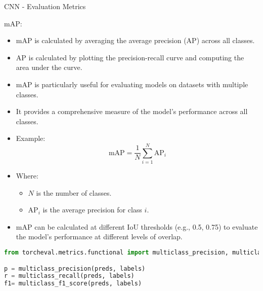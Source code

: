 \begin{frame}{CNN - Evaluation Metrics}
\begin{block}{mAP:}
    \begin{itemize}
        \item mAP is calculated by averaging the average precision (AP) across all classes.
        \item AP is calculated by plotting the precision-recall curve and computing the area under the curve.
        \item mAP is particularly useful for evaluating models on datasets with multiple classes.
        \item It provides a comprehensive measure of the model's performance across all classes.
        \item Example:
            \[
            \text{mAP} = \frac{1}{N} \sum_{i=1}^{N} \text{AP}_i
            \]
            \item Where:
                \begin{itemize}
                    \item \(N\) is the number of classes.
                    \item \(\text{AP}_i\) is the average precision for class \(i\).
                \end{itemize}
        \item mAP can be calculated at different IoU thresholds (e.g., 0.5, 0.75) to evaluate the model's performance at different levels of overlap.
    \end{itemize}
\end{block}
\framebreak

\begin{lstlisting}[language=Python, caption={Code snippet (PyTorch)}, basicstyle=\ttfamily\footnotesize]
from torcheval.metrics.functional import multiclass_precision, multiclass_recall, multiclass_f1_score

p = multiclass_precision(preds, labels)
r = multiclass_recall(preds, labels)
f1= multiclass_f1_score(preds, labels)
\end{lstlisting}
\end{frame} 
